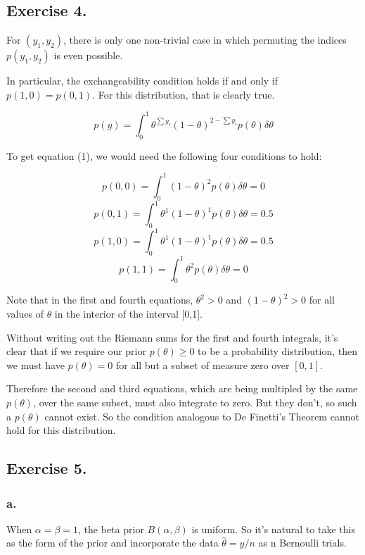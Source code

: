 \documentclass{article}
\begin{document}
\newpage

\subsection{Exercise 4.}

For \((y_1, y_2)\), there is only one non-trivial case in which
permuting the indices \(p(y_1, y_2)\) is even possible.

In particular, the exchangeability condition holds if and only if
\(p(1, 0) = p(0, 1)\). For this distribution, that is clearly true.

\begin{equation}
p(y) = \int_0^1  \theta^{\sum y_i}(1 - \theta)^{2 - \sum y_i} p(\theta) \delta\theta
\end{equation}

To get equation (1), we would need the following four conditions to hold:

\[p(0,0) = \int_0^1   (1 - \theta)^{2} p(\theta) \delta\theta = 0\]
\[p(0,1) = \int_0^1 \theta^1(1 - \theta)^1 p(\theta)\delta\theta = 0.5\]
\[p(1,0) = \int_0^1 \theta^1(1 - \theta)^{1} p(\theta)\delta\theta = 0.5\]
\[p(1,1) = \int_0^1 \theta^{2} p(\theta)\delta\theta = 0 \]

Note that in the first and fourth equations, \(\theta^2 > 0\) and \((1 - \theta)^2 > 0\)
for all values of \(\theta\) in the interior of the interval [0,1]. 

Without writing out the Riemann sums for the first and fourth integrals,
it's clear that if we require our prior \(p(\theta) \geq 0\) 
to be a probability distribution, 
then we must have \(p(\theta) = 0\) for all but a subset of measure zero
over \([0, 1]\).

Therefore the second and third equations,
which are being multipled by the same \(p(\theta)\), over
the same subset, must also integrate to zero. But they don't, so 
such a \(p(\theta)\) cannot exist. So the condition analogous
to De Finetti's Theorem cannot hold for this distribution.

\subsection{Exercise 5.}

\subsubsection{a.}

When \(\alpha = \beta = 1\), the beta prior \(B(\alpha, \beta)\) is uniform. So it's natural to take this
as the form of the prior and incorporate the data \(\hat{\theta} = y / n\) as n Bernoulli trials.
\end{document}
